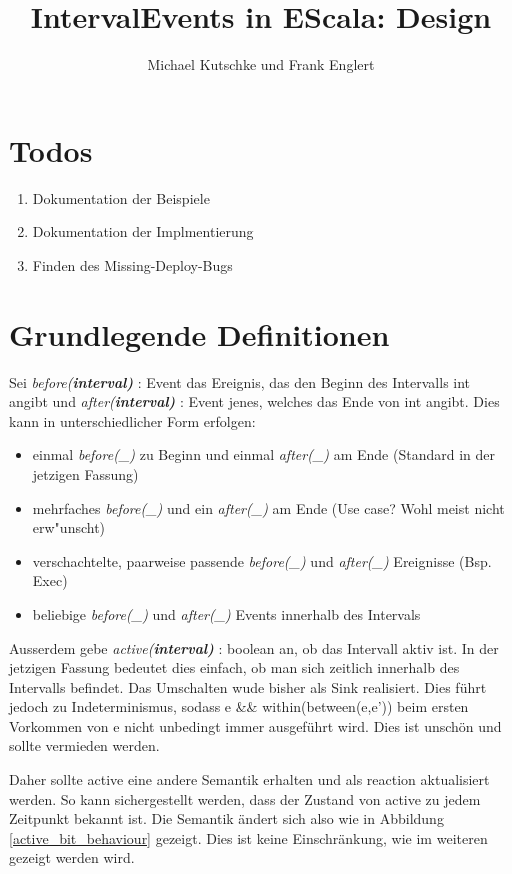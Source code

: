 \documentclass[article,colorback,accentcolor=tud4c]{tudreport}
\title{IntervalEvents in EScala: Design}
\subtitle{Michael Kutschke und Frank Englert}
\newcommand{\before}[1]{\textit{ before(#1) }}
\newcommand{\after}[1]{\textit{after(#1)}}
\newcommand{\aktiv}[1]{\textit{active(#1)}}
\newcommand{\Interval}[1]{\textbf{interval#1}}
\begin{document}
\maketitle

\tableofcontents

\section{Todos}
\begin{enumerate}
  \item Dokumentation der Beispiele
  \item Dokumentation der Implmentierung
  \item Finden des Missing-Deploy-Bugs 
\end{enumerate}

\section{Grundlegende Definitionen}

Sei \before{\Interval} : Event das Ereignis, das den Beginn des Intervalls int angibt
und \after{\Interval} : Event jenes, welches das Ende von int angibt. Dies kann in
unterschiedlicher Form erfolgen:
\begin{itemize}
\item einmal \before{\_} zu Beginn und einmal \after{\_} am Ende (Standard in der jetzigen Fassung)
\item mehrfaches \before{\_} und ein \after{\_} am Ende (Use case? Wohl meist nicht erw"unscht)
\item verschachtelte, paarweise passende \before{\_} und \after{\_} Ereignisse (Bsp. Exec)
\item beliebige \before{\_} und \after{\_} Events innerhalb des Intervals
\end{itemize}
Ausserdem gebe \aktiv\Interval{} : boolean an, ob das Intervall aktiv ist.
In der jetzigen Fassung bedeutet dies einfach, ob man sich zeitlich innerhalb des
Intervalls befindet. Das Umschalten wude bisher als Sink realisiert. Dies führt
jedoch zu Indeterminismus, sodass e \&\& within(between(e,e')) beim ersten Vorkommen 
von e nicht unbedingt immer ausgeführt wird. Dies ist unschön und sollte vermieden werden.

Daher sollte active eine andere Semantik erhalten und als reaction aktualisiert
werden. So kann sichergestellt werden, dass der Zustand von active zu jedem
Zeitpunkt bekannt ist. Die Semantik ändert sich also wie in Abbildung
\ref{active_bit_behaviour} gezeigt. Dies ist keine Einschränkung, wie im
weiteren gezeigt werden wird.
\end{document}
